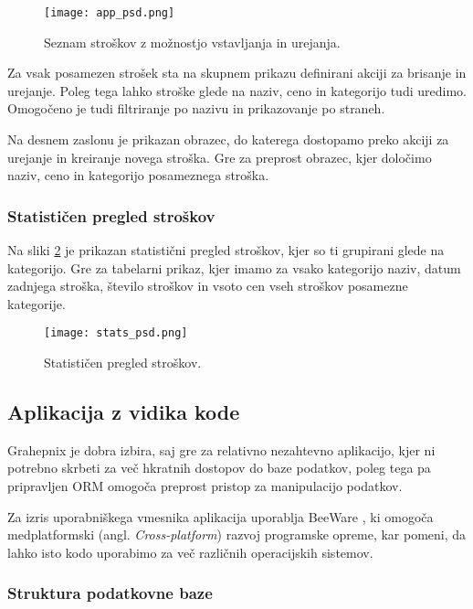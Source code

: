 \documentclass[a4paper,12pt,openright]{book}
\begin{document}
    \begin{figure}[H]
        \centerline{\texttt{[image: app\_psd.png]}}
        \caption{Seznam stroškov z možnostjo vstavljanja in urejanja.}
        \label{home_screen}
    \end{figure}

    \noindent
    Za vsak posamezen strošek sta na skupnem prikazu definirani akciji za brisanje in urejanje. Poleg tega lahko stroške glede na naziv, ceno in kategorijo tudi uredimo. Omogočeno je tudi filtriranje po nazivu in prikazovanje po straneh.

    Na desnem zaslonu je prikazan obrazec, do katerega dostopamo preko akciji za urejanje in kreiranje novega stroška. Gre za preprost obrazec, kjer določimo naziv, ceno in kategorijo posameznega stroška.

    \subsubsection{Statističen pregled stroškov}
    Na sliki \ref{stats_screen} je prikazan statistični pregled stroškov, kjer so ti grupirani glede na kategorijo. Gre za tabelarni prikaz, kjer imamo za vsako kategorijo naziv, datum zadnjega stroška, število stroškov in vsoto cen vseh stroškov posamezne kategorije.

    \begin{figure}[H]
        \centerline{\texttt{[image: stats\_psd.png]}}
        \caption{Statističen pregled stroškov.}
        \label{stats_screen}
    \end{figure}

    \subsection{Aplikacija z vidika kode}

    Grahepnix je dobra izbira, saj gre za relativno nezahtevno aplikacijo, kjer ni potrebno skrbeti za več hkratnih dostopov do baze podatkov, poleg tega pa pripravljen ORM omogoča preprost pristop za manipulacijo podatkov.

    Za izris uporabniškega vmesnika aplikacija uporablja BeeWare \cite{BEE_WARE}, ki omogoča medplatformski (angl. \textit{Cross-platform}) razvoj programske opreme, kar pomeni, da lahko isto kodo uporabimo za več različnih operacijskih sistemov.

    \subsubsection{Struktura podatkovne baze}
\end{document}

